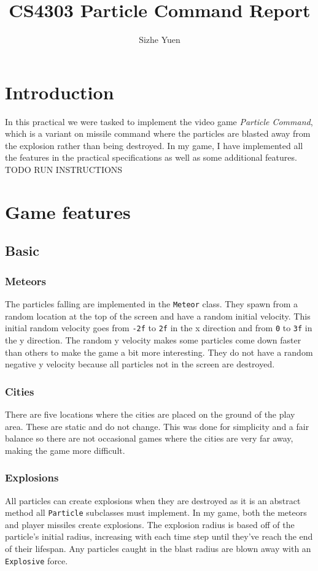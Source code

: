 \documentclass{article}
\title{CS4303 Particle Command Report}
\author{Sizhe Yuen}
\newcommand{\n}[0]{\\[\baselineskip]}
\begin{document}
\maketitle

\section{Introduction}
In this practical we were tasked to implement the video game \textit{Particle Command}, which is a variant on missile command where the particles are blasted away from the explosion rather than being destroyed. In my game, I have implemented all the features in the practical specifications as well as some additional features.
\n
TODO RUN INSTRUCTIONS

\section{Game features}

\subsection{Basic}
\subsubsection*{Meteors}
The particles falling are implemented in the \texttt{Meteor} class. They spawn from a random location at the top of the screen and have a random initial velocity. This initial random velocity goes from \texttt{-2f} to \texttt{2f} in the x direction and from \texttt{0} to \texttt{3f} in the y direction. The random y velocity makes some particles come down faster than others to make the game a bit more interesting. They do not have a random negative y velocity because all particles not in the screen are destroyed. 

\subsubsection*{Cities}
There are five locations where the cities are placed on the ground of the play area. These are static and do not change. This was done for simplicity and a fair balance so there are not occasional games where the cities are very far away, making the game more difficult. 

\subsubsection*{Explosions}
All particles can create explosions when they are destroyed as it is an abstract method all \texttt{Particle} subclasses must implement. In my game, both the meteors and player missiles create explosions. The explosion radius is based off of the particle's initial radius, increasing with each time step until they've reach the end of their lifespan. Any particles caught in the blast radius are blown away with an \texttt{Explosive} force. 
\end{document}
